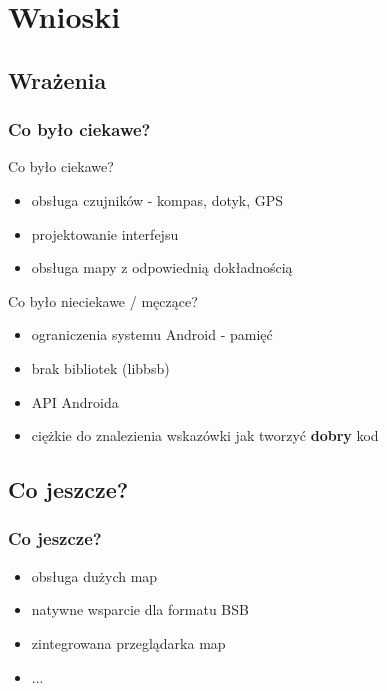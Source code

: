 \documentclass{beamer}
\begin{document}
\section{Wnioski}
\subsection{Wrażenia}
\begin{frame}
\frametitle{Co było ciekawe?}
Co było ciekawe?
\begin{itemize}
	\item {obsługa czujników - kompas, dotyk, GPS}
	\item {projektowanie interfejsu}
	\item {obsługa mapy z odpowiednią dokładnością}
\end{itemize}
\vskip20pt
\pause
Co było nieciekawe / męczące?
\begin{itemize}
	\item {ograniczenia systemu Android - pamięć}
	\item {brak bibliotek (libbsb)}
	\item {API Androida}
	\item {ciężkie do znalezienia wskazówki jak tworzyć \textbf{dobry} kod}
\end{itemize}
\end{frame}

\subsection{Co jeszcze?}
\begin{frame}
\frametitle{Co jeszcze?}
\begin{itemize}
	\item {obsługa dużych map}
	\item {natywne wsparcie dla formatu BSB}
	\item {zintegrowana przeglądarka map}
	\item {...}
\end{itemize}
\end{frame}
\end{document}
